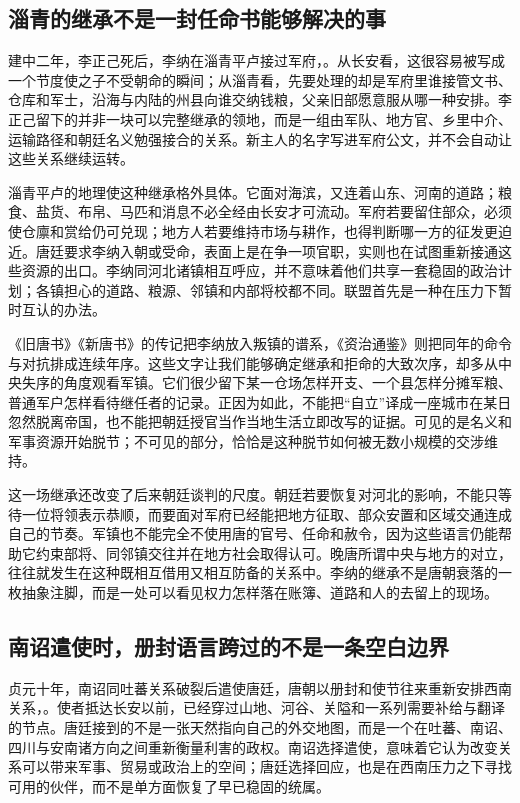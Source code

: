 \subsection{淄青的继承不是一封任命书能够解决的事}
建中二年，李正己死后，李纳在淄青平卢接过军府，。从长安看，这很容易被写成一个节度使之子不受朝命的瞬间；从淄青看，先要处理的却是军府里谁接管文书、仓库和军士，沿海与内陆的州县向谁交纳钱粮，父亲旧部愿意服从哪一种安排。李正己留下的并非一块可以完整继承的领地，而是一组由军队、地方官、乡里中介、运输路径和朝廷名义勉强接合的关系。新主人的名字写进军府公文，并不会自动让这些关系继续运转。

淄青平卢的地理使这种继承格外具体。它面对海滨，又连着山东、河南的道路；粮食、盐货、布帛、马匹和消息不必全经由长安才可流动。军府若要留住部众，必须使仓廪和赏给仍可兑现；地方人若要维持市场与耕作，也得判断哪一方的征发更迫近。唐廷要求李纳入朝或受命，表面上是在争一项官职，实则也在试图重新接通这些资源的出口。李纳同河北诸镇相互呼应，并不意味着他们共享一套稳固的政治计划；各镇担心的道路、粮源、邻镇和内部将校都不同。联盟首先是一种在压力下暂时互认的办法。

《旧唐书》《新唐书》的传记把李纳放入叛镇的谱系，《资治通鉴》则把同年的命令与对抗排成连续年序。这些文字让我们能够确定继承和拒命的大致次序，却多从中央失序的角度观看军镇。它们很少留下某一仓场怎样开支、一个县怎样分摊军粮、普通军户怎样看待继任者的记录。正因为如此，不能把“自立”译成一座城市在某日忽然脱离帝国，也不能把朝廷授官当作当地生活立即改写的证据。可见的是名义和军事资源开始脱节；不可见的部分，恰恰是这种脱节如何被无数小规模的交涉维持。

这一场继承还改变了后来朝廷谈判的尺度。朝廷若要恢复对河北的影响，不能只等待一位将领表示恭顺，而要面对军府已经能把地方征取、部众安置和区域交通连成自己的节奏。军镇也不能完全不使用唐的官号、任命和赦令，因为这些语言仍能帮助它约束部将、同邻镇交往并在地方社会取得认可。晚唐所谓中央与地方的对立，往往就发生在这种既相互借用又相互防备的关系中。李纳的继承不是唐朝衰落的一枚抽象注脚，而是一处可以看见权力怎样落在账簿、道路和人的去留上的现场。

\subsection{南诏遣使时，册封语言跨过的不是一条空白边界}
贞元十年，南诏同吐蕃关系破裂后遣使唐廷，唐朝以册封和使节往来重新安排西南关系，。使者抵达长安以前，已经穿过山地、河谷、关隘和一系列需要补给与翻译的节点。唐廷接到的不是一张天然指向自己的外交地图，而是一个在吐蕃、南诏、四川与安南诸方向之间重新衡量利害的政权。南诏选择遣使，意味着它认为改变关系可以带来军事、贸易或政治上的空间；唐廷选择回应，也是在西南压力之下寻找可用的伙伴，而不是单方面恢复了早已稳固的统属。


